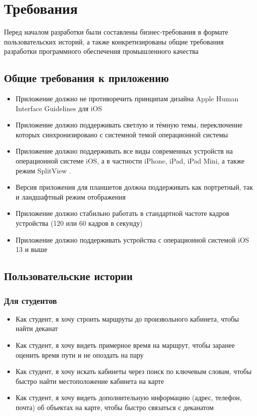\chapter{Требования}
  Перед началом разработки были составлены бизнес-требования в формате пользовательских историй, а также конкретизированы общие требования разработки программного обеспечения промышленного качества

  \section{Общие требования к приложению}
    \begin{itemize}
      \item Приложение должно не противоречить принципам дизайна Apple Human Interface Guidelines для iOS \cite{HumanInterfaceGuidelines}
      \item Приложение должно поддерживать светлую и тёмную темы, переключение которых синхронизировано с системной темой операционной системы
      \item Приложение должно поддерживать все виды современных устройств на операционной системе iOS, а в частности iPhone, iPad, iPad Mini, а также режим SplitView \cite{SplitView}.
      \item Версия приложения для планшетов должна поддерживать как портретный, так и ландшафтный режим отображения
      \item Приложение должно стабильно работать в стандартной частоте кадров устройства (120 или 60 кадров в секунду)
      \item Приложение должно поддерживать устройства с операционной системой iOS 13 и выше
    \end{itemize}

  \section{Пользовательские истории}
    \subsection{Для студентов}
      \begin{itemize}
        \item Как студент, я хочу строить маршруты до произвольного кабинета, чтобы найти деканат
        \item Как студент, я хочу видеть примерное время на маршрут, чтобы заранее оценить время пути и не опоздать на пару
        \item Как студент, я хочу искать кабинеты через поиск по ключевым словам, чтобы быстро найти местоположение кабинета на карте
        \item Как студент, я хочу видеть дополнительную информацию (адрес, телефон, почта) об объектах на карте, чтобы быстро связаться с деканатом
      \end{itemize}
